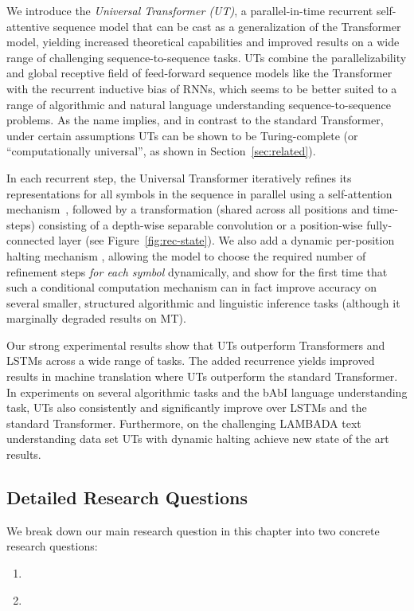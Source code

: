 We introduce the \emph{Universal Transformer (UT)}, a parallel-in-time recurrent self-attentive sequence model that can be cast as a generalization of the Transformer model, yielding increased theoretical capabilities and improved results on a wide range of challenging sequence-to-sequence tasks. 
UTs combine the parallelizability and global receptive field of feed-forward sequence models like the Transformer with the recurrent inductive bias of RNNs, which seems to be better suited to a range of algorithmic and natural language understanding sequence-to-sequence problems. As the name implies, and in contrast to the standard Transformer, under certain assumptions UTs can be shown to be Turing-complete (or ``computationally universal'', as shown in Section~\ref{sec:related}).

In each recurrent step, the Universal Transformer iteratively refines its representations for all symbols in the sequence in parallel using a self-attention mechanism~\citep{decomposableAttnModel,lin2017structured}, followed by a transformation (shared across all positions and time-steps) consisting of a depth-wise separable convolution \citep{xception2016,slicenet} or a position-wise fully-connected layer (see Figure~\ref{fig:rec-state}). We also add a dynamic per-position halting mechanism \citep{graves2016adaptive}, allowing the model to choose the required number of refinement steps \emph{for each symbol} dynamically, and show for the first time that such a conditional computation mechanism can in fact improve accuracy on several smaller, structured algorithmic and linguistic inference tasks (although it marginally degraded results on MT). 

Our strong experimental results show that UTs outperform Transformers and LSTMs across a wide range of tasks. The added recurrence yields improved results in machine translation where UTs outperform the standard Transformer. In experiments on several algorithmic tasks and the bAbI language understanding task, UTs also consistently and significantly improve over LSTMs and the standard Transformer. Furthermore, on the challenging LAMBADA text understanding data set UTs with dynamic halting achieve new state of the art results.

\subsection{Detailed Research Questions}
We break down our main research question in this chapter into two concrete research questions:
\begin{resqbox}
\begin{enumerate}
\item[\textbf{\resqname{c6.1}}] \emph{}
\item[\textbf{\resqname{c6.2}}] \emph{}
\end{enumerate}
\end{resqbox}

